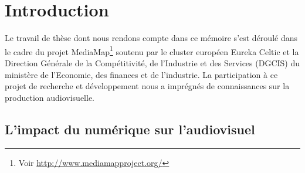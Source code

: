 


\chapter{Introduction}\label{chap:intro}

Le travail de thèse dont nous rendons compte dans ce mémoire s'est déroulé dans le cadre du projet MediaMap\footnote{Voir \url{http://www.mediamapproject.org/}} soutenu par le cluster européen Eureka Celtic et la Direction Générale de la Compétitivité, de l'Industrie et
des Services (DGCIS) du ministère de l'Economie, des finances et de l'industrie.
La participation à ce projet de recherche et développement nous a imprégnés de connaissances sur la production audiovisuelle.





\section{L'impact du numérique sur l'audiovisuel}\label{sec:motiv}

